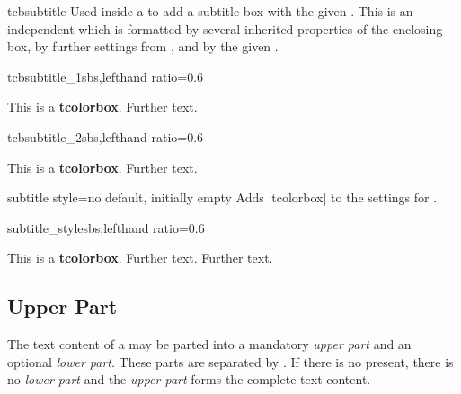\begin{docCommand}[doc new=2014-10-10]{tcbsubtitle}{}
  Used inside a  to add a subtitle box with the given .
  This is an independent  which is formatted by several
  inherited properties of the enclosing box, by further settings from
  , and by the given .
\begin{exdispExample*}{tcbsubtitle_1}{sbs,lefthand ratio=0.6}
\begin{tcolorbox}[title=My title,
    colback=red!5!white,
    colframe=red!75!black,
    fonttitle=\bfseries]
  This is a \textbf{tcolorbox}.
  Further text.
\end{tcolorbox}
\end{exdispExample*}
\begin{exdispExample*}{tcbsubtitle_2}{sbs,lefthand ratio=0.6}
\begin{tcolorbox}[title=My title,
    colback=red!5!white,
    colframe=red!75!black,
    colbacktitle=yellow!50!red,
    coltitle=red!25!black,
    fonttitle=\bfseries]
  This is a \textbf{tcolorbox}.
  Further text.
\end{tcolorbox}
\end{exdispExample*}
\end{docCommand}

\begin{docTcbKey}[][doc new=2014-10-10]{subtitle style}{=}{no default, initially empty}
  Adds |tcolorbox|  to the settings for .
\begin{exdispExample*}{subtitle_style}{sbs,lefthand ratio=0.6}
\begin{tcolorbox}[title=My title,
  colback=red!5!white,
  colframe=red!75!black,
  colbacktitle=yellow!50!red,
  coltitle=red!25!black,
  fonttitle=\bfseries,
  subtitle style={boxrule=0.4pt,
    colback=yellow!50!red!25!white} ]
  This is a \textbf{tcolorbox}.
  Further text.
  Further text.
\end{tcolorbox}
\end{exdispExample*}
\end{docTcbKey}

\clearpage
\subsection{Upper Part}
The text content of a  may be parted into a mandatory \emph{upper part}
and an optional \emph{lower part}. These parts are separated by
. If there is no  present, there is no
\emph{lower part} and the \emph{upper part} forms the complete text content.

